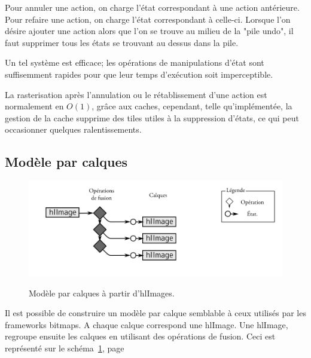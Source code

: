 			Pour annuler une action, on charge l'état correspondant à une action antérieure. Pour refaire une action,
			on charge l'état correspondant à celle-ci. Lorsque l'on désire ajouter une action alors que l'on se trouve au milieu de la "pile undo",
			il faut supprimer tous les états se trouvant au dessus dans la pile. 

			Un tel système est efficace; les opérations de manipulations d'état sont suffisemment rapides pour que leur temps d'exécution
			soit imperceptible.
			
			La rasterisation après l'annulation ou le rétablissement d'une action est normalement en $O(1)$, grâce aux caches, 
			cependant, telle qu'implémentée, la gestion de la cache supprime des tiles utiles à la suppression d'états, ce qui peut occasionner
			quelques ralentissements. 
		\subsection{Modèle par calques}
		\begin{figure}[ht]
			\centering
			\includegraphics[width=\textwidth]{images/hl-calques} 
			\label{fig:hl-calques}
			\caption{Modèle par calques à partir d'hlImages.}
		\end{figure}
			Il est possible de construire un modèle par calque semblable à ceux utilisés par les frameworks bitmaps. A chaque calque correspond
			une hlImage. Une hlImage, regroupe ensuite les calques en utilisant des opérations de fusion. Ceci est représenté 
			sur le schéma~\ref{fig:hl-calques}, page~\pageref{fig:hl-calques}

